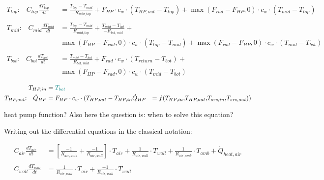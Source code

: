 {\color{teal}
\begin{equation}
	\label{eq:buffer}
	\begin{aligned}
	T_{top} \text{:} \quad C_{top}\frac{dT_{top}}{dt} &= \frac{T_{top}-T_{mid}}{-R_{mid, top}} + F_{HP} \cdot c_w \cdot (T_{HP,out} - T_{top}) + \max(F_{rad}-F_{HP}, 0) \cdot c_w \cdot (T_{mid} - T_{top})
    \\ \\
    T_{mid} \text{:} \quad C_{mid}\frac{dT_{mid}}{dt} &= \frac{T_{top}-T_{mid}}{R_{mid, top}} + \frac{T_{mid}-T_{bot}}{-R_{bot, mid}} + \\
    & \max(F_{HP}-F_{rad}, 0) \cdot c_w \cdot (T_{top} - T_{mid}) + \max(F_{rad}-F_{HP}, 0) \cdot c_w \cdot (T_{mid} - T_{bot}) 
    \\ \\
    T_{bot} \text{:} \quad C_{bot}\frac{dT_{bot}}{dt} &= \frac{T_{mid}-T_{bot}}{R_{bot, mid}} + F_{rad} \cdot c_w \cdot (T_{return} - T_{bot}) + \\
    & \max(F_{HP}-F_{rad}, 0) \cdot c_w \cdot (T_{mid} - T_{bot})
	\end{aligned}
\end{equation}
}

\begin{equation}
	\begin{aligned}
		T_{HP,in} &= {\color{teal}T_{bot}} \\
		T_{HP,out} \text{:} \quad \dot{Q}_{HP} &= F_{HP} \cdot c_w \cdot (T_{HP,out} - T_{HP,in}
		\dot{Q}_{HP} &= f(T_{HP,in}\text{,} T_{HP,out}\text{,} T_{src,in}\text{,} T_{src,out}))
	\end{aligned}
\end{equation}

{\color{red} heat pump function? Also here the question is: when to solve this equation?}


Writing out the differential equations in the classical notation:

\begin{equation}
	\begin{aligned}
		C_{air}\frac{dT_{air}}{dt} &= \left[ \frac{-1}{R_{air, amb}} + \frac{-1}{R_{air, wall}} \right]  \cdot T_{air}  + \frac{1}{R_{air, wall}} \cdot T_{wall} + \frac{1}{R_{air, amb}} \cdot T_{amb} + \dot{Q}_{heat, air}
		\\ \\
		C_{wall}\frac{dT_{wall}}{dt} &= \frac{1}{R_{air, wall}} \cdot T_{air} + \frac{-1}{R_{air, wall}}   \cdot T_{wall}
	\end{aligned}
\end{equation}

